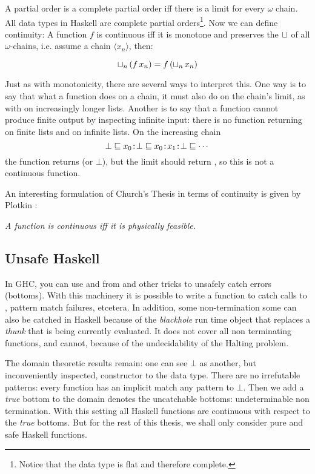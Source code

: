 A partial order is a complete partial order iff there is a limit for
every $\omega$ chain. All data types in Haskell are complete partial
orders\footnote{Notice that the data type
   is flat and therefore complete.}.
Now we can define continuity: A function $f$ is continuous iff it is
monotone and preserves the $\sqcup_{}$ of all $\omega$-chains, i.e.
assume a chain $\langle x_n \rangle$, then:

\begin{equation*}
\sqcup_{n} \, (f \, x_n) = f \, (\sqcup_{n} \, x_n)
\end{equation*}

Just as with monotonicity, there are several ways to interpret
this. One way is to say that what a function does on a chain, it must
also do on the chain's limit, as with  on increasingly longer
lists. Another is to say that a function cannot produce finite output by
inspecting infinite input: there is no function
 returning  on finite lists and
 on infinite lists. On the increasing chain
$$ \bot \sqsubseteq x_0 \hs{:} \bot \sqsubseteq x_0 \hs{:} x_1 \hs{:} \bot
\sqsubseteq \cdots$$
the function  returns  (or $\bot$), but the
limit should return , so this is not a continuous function.

An interesting formulation of Church's Thesis in terms of continuity
is given by Plotkin \cite{domains}:

\begin{center}
\emph{A function is continuous iff it is physically feasible.}
\end{center}

\subsection{Unsafe Haskell}
In GHC, you can use  and  from
 and other tricks to unsafely catch errors
(bottoms). With this machinery it is possible to write a function
 to catch calls to ,
pattern match failures, etcetera. In addition, some non-termination some can
also be catched in Haskell because of the \emph{blackhole} run time
object that replaces a \emph{thunk} that is being currently
evaluated. It does not cover all non terminating functions, and
cannot, because of the undecidability of the Halting problem.

The domain theoretic results remain: one can see $\bot$ as another,
but inconveniently inspected, constructor to the data type. There are
no irrefutable patterns: every function has an implicit match any
pattern to $\bot$.  Then we add a \emph{true} bottom to the domain
denotes the uncatchable bottoms: undeterminable non termination. With
this setting all Haskell functions are continuous with respect to the
\emph{true} bottoms. But for the rest of this thesis, we shall only
consider pure and safe Haskell functions.
